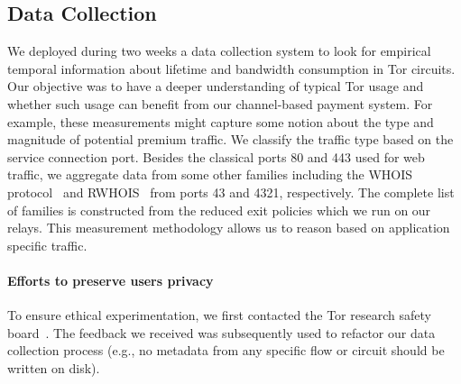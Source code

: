 
\subsection{Data Collection}
\label{subsec:datacollection}

We deployed during two weeks a data collection system to look for empirical
temporal information about lifetime and bandwidth consumption in Tor circuits.
Our objective was to have a deeper understanding of typical Tor usage and
whether such usage can benefit from our channel-based payment system. For
example, these measurements might capture some notion about the type and
magnitude of potential premium traffic. We classify the traffic type based on
the service connection port. Besides the classical ports 80 and 443 used for web
traffic, we aggregate data from some other families including the WHOIS
protocol~\cite{daigle2004whois} and RWHOIS~\cite{williamson1994referral} from
ports 43 and 4321, respectively. The complete list of families is constructed
from the reduced exit policies which we run on our relays. This measurement
methodology allows us to reason based on application specific traffic.


\paragraph*{Efforts to preserve users privacy}

To ensure ethical experimentation, we first contacted the Tor research safety
board~\cite{torsafety}. The feedback we received was subsequently used to
refactor our data collection process (e.g., no metadata from any specific flow
or circuit should be written on disk).

